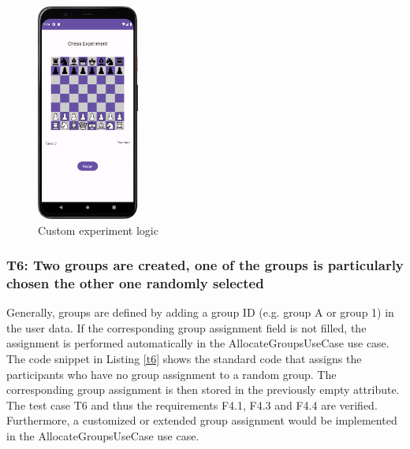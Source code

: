 \begin{figure}[htbp]
    \centering
    \includegraphics[width=0.3\textwidth, keepaspectratio]{content/07_evaluation_of_the_solution/Screenshot_Chess.png}
    \caption{Custom experiment logic}    
    \label{fig:chess}
\end{figure}

\newpage\subsubsection*{T6: Two groups are created, one of the groups is particularly chosen the other one randomly selected}

Generally, groups are defined by adding a group ID (e.g. group A or group 1) in the user data. If the corresponding group assignment field is not filled, the assignment is performed automatically in the AllocateGroupsUseCase use case. The code snippet in Listing \ref{t6} shows the standard code that assigns the participants who have no group assignment to a random group. The corresponding group assignment is then stored in the previously empty attribute. The test case T6 and thus the requirements F4.1, F4.3 and F4.4 are verified. Furthermore, a customized or extended group assignment would be implemented in the AllocateGroupsUseCase use case.

\vspace{1cm}

